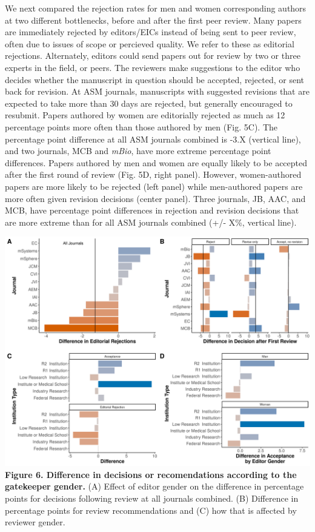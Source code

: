 \documentclass[11pt,]{article}
\begin{document}
We next compared the rejection rates for men and women corresponding
authors at two different bottlenecks, before and after the first peer
review. Many papers are immediately rejected by editors/EICs instead of
being sent to peer review, often due to issues of scope or percieved
quality. We refer to these as editorial rejections. Alternately, editors
could send papers out for review by two or three experts in the field,
or peers. The reviewers make suggestions to the editor who decides
whether the manuscript in question should be accepted, rejected, or sent
back for revision. At ASM journals, manuscripts with suggested revisions
that are expected to take more than 30 days are rejected, but generally
encouraged to resubmit. Papers authored by women are editorially
rejected as much as 12 percentage points more often than those authored
by men (Fig. 5C). The percentage point difference at all ASM journals
combined is -3.X (vertical line), and two journals, MCB and \emph{mBio},
have more extreme percentage point differences. Papers authored by men
and women are equally likely to be accepted after the first round of
review (Fig. 5D, right panel). However, women-authored papers are more
likely to be rejected (left panel) while men-authored papers are more
often given revision decisions (center panel). Three journals, JB, AAC,
and MCB, have percentage point differences in rejection and revision
decisions that are more extreme than for all ASM journals combined (+/-
X\%, vertical line).

\includegraphics{Figure_7.png} \textbf{Figure 6. Difference in decisions
or recomendations according to the gatekeeper gender.} (A) Effect of
editor gender on the difference in percentage points for decisions
following review at all journals combined. (B) Difference in percentage
points for review recommendations and (C) how that is affected by
reviewer gender.
\end{document}
